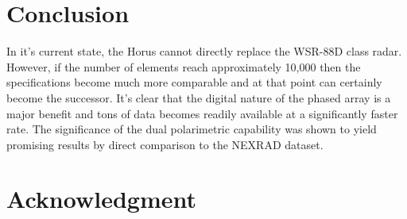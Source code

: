 \documentclass[conference]{IEEEtran}
\begin{document}
\section{Conclusion}
\par In it's current state, the Horus cannot directly replace the WSR-88D class radar. However, if the number of elements reach approximately 10,000 then the specifications become much more comparable and at that point can certainly become the successor. It's clear that the digital nature of the phased array is a major benefit and tons of data becomes readily available at a significantly faster rate. The significance of the dual polarimetric capability was shown to yield promising results by direct comparison to the NEXRAD dataset.
\section*{Acknowledgment}
\end{document}
